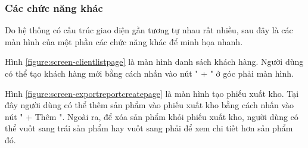\documentclass[../DoAn.tex]{subfiles}
\begin{document}
\subsubsection{Các chức năng khác}
Do hệ thống có cấu trúc giao diện gần tương tự nhau rất nhiều, sau đây là các màn hình của một phần các chức năng khác để minh họa nhanh.

Hình \ref{figure:screen-clientlistpage} là màn hình danh sách khách hàng. Người dùng có thể tạo khách hàng mới bằng cách nhấn vào nút " + " ở góc phải màn hình.

Hình \ref{figure:screen-exportreportcreatepage} là màn hình tạo phiếu xuất kho. Tại đây người dùng có thể thêm sản phẩm vào phiếu xuất kho bằng cách nhấn vào nút " + Thêm ". Ngoài ra, để xóa sản phẩm khỏi phiếu xuất kho, người dùng có thể vuốt sang trái sản phẩm hay vuốt sang phải để xem chi tiết hơn sản phẩm đó.
\end{document}
